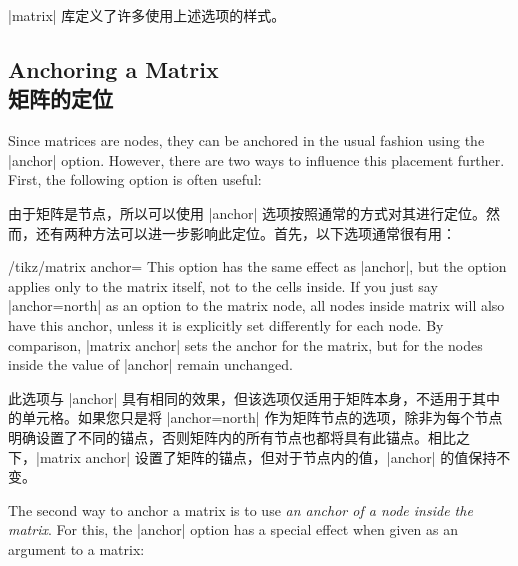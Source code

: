|matrix| 库定义了许多使用上述选项的样式。


\subsection{Anchoring a Matrix\\矩阵的定位}

Since matrices are nodes, they can be anchored in the usual fashion using the
|anchor| option. However, there are two ways to influence this placement
further. First, the following option is often useful:

由于矩阵是节点，所以可以使用 |anchor| 选项按照通常的方式对其进行定位。然而，还有两种方法可以进一步影响此定位。首先，以下选项通常很有用：

\begin{key}{/tikz/matrix anchor=}
    This option has the same effect as |anchor|, but the option applies only to
    the matrix itself, not to the cells inside. If you just say |anchor=north|
    as an option to the matrix node, all nodes inside matrix will also have
    this anchor, unless it is explicitly set differently for each node. By
    comparison, |matrix anchor| sets the anchor for the matrix, but for the
    nodes inside the value of |anchor| remain unchanged.
    
    此选项与 |anchor| 具有相同的效果，但该选项仅适用于矩阵本身，不适用于其中的单元格。如果您只是将 |anchor=north| 作为矩阵节点的选项，除非为每个节点明确设置了不同的锚点，否则矩阵内的所有节点也都将具有此锚点。相比之下，|matrix anchor| 设置了矩阵的锚点，但对于节点内的值，|anchor| 的值保持不变。


\begin{codeexample}[]
\end{codeexample}
\end{key}

The second way to anchor a matrix is to use \emph{an anchor of a node inside
the matrix}. For this, the |anchor| option has a special effect when given as
an argument to a matrix:

